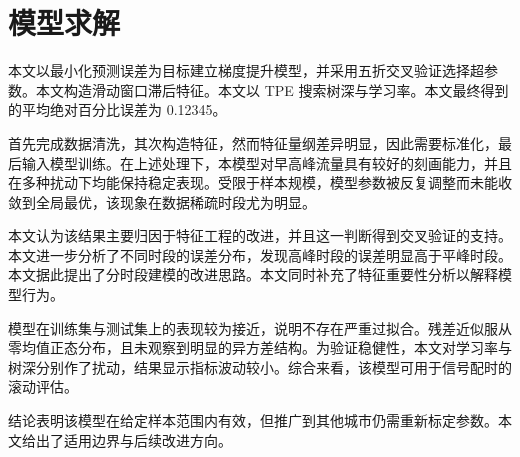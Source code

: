 
\section{模型求解}

本文以最小化预测误差为目标建立梯度提升模型，并采用五折交叉验证选择超参数。本文构造滑动窗口滞后特征。本文以 TPE 搜索树深与学习率。本文最终得到的平均绝对百分比误差为 0.12345。

首先完成数据清洗，其次构造特征，然而特征量纲差异明显，因此需要标准化，最后输入模型训练。在上述处理下，本模型对早高峰流量具有较好的刻画能力，并且在多种扰动下均能保持稳定表现。受限于样本规模，模型参数被反复调整而未能收敛到全局最优，该现象在数据稀疏时段尤为明显。

本文认为该结果主要归因于特征工程的改进，并且这一判断得到交叉验证的支持。本文进一步分析了不同时段的误差分布，发现高峰时段的误差明显高于平峰时段。本文据此提出了分时段建模的改进思路。本文同时补充了特征重要性分析以解释模型行为。

模型在训练集与测试集上的表现较为接近，说明不存在严重过拟合。残差近似服从零均值正态分布，且未观察到明显的异方差结构。为验证稳健性，本文对学习率与树深分别作了扰动，结果显示指标波动较小。综合来看，该模型可用于信号配时的滚动评估。

结论表明该模型在给定样本范围内有效，但推广到其他城市仍需重新标定参数。本文给出了适用边界与后续改进方向。
